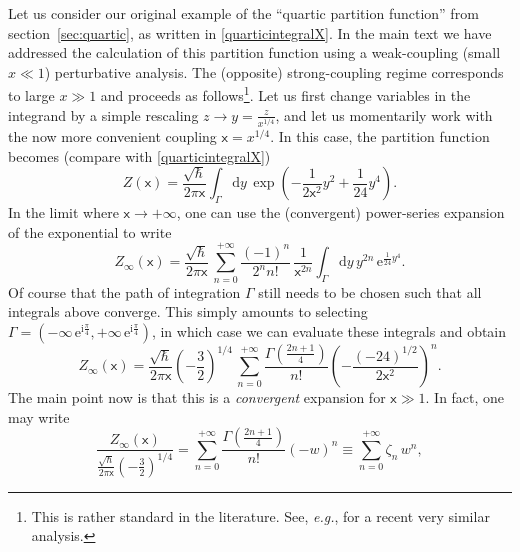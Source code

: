 \documentclass[11pt,a4paper]{article}
\newcommand{\rme}{{\mathrm{e}}}
\newcommand{\rmi}{{\mathrm{i}}}
\newcommand{\rmd}{{\mathrm{d}}}
\begin{document}
Let us consider our original example of the ``quartic partition function'' from section~\ref{sec:quartic}, as written in \eqref{quarticintegralX}. In the main text we have addressed the calculation of this partition function using a weak-coupling (small $x\ll1$) perturbative analysis. The (opposite) strong-coupling regime corresponds to large $x\gg1$ and proceeds as follows\footnote{This is rather standard in the literature. See, \textit{e.g.}, \cite{chps16} for a recent very similar analysis.}. Let us first change variables in the integrand by a simple rescaling $z \to y=\frac{z}{x^{1/4}}$, and let us momentarily work with the now more convenient coupling $\mathsf{x}=x^{1/4}$. In this case, the partition function becomes (compare with \eqref{quarticintegralX})
%
\begin{equation}
\label{quarticintegralX-app}
Z (\mathsf{x}) = \frac{\sqrt{\hbar}}{2\pi\mathsf{x}} \int_{\Gamma} \rmd y\, \exp \left( - \frac{1}{2\mathsf{x}^2} y^2 + \frac{1}{24} y^4 \right).
\end{equation}
%
\noindent
In the limit where $\mathsf{x} \to +\infty$, one can use the (convergent) power-series expansion of the exponential to write
%
\begin{equation}
Z_{\infty} (\mathsf{x}) = \frac{\sqrt{\hbar}}{2\pi\mathsf{x}}\, \sum_{n=0}^{+\infty} \frac{(-1)^n}{2^n n!}\, \frac{1}{\mathsf{x}^{2n}} \int_{\Gamma} \rmd y\, y^{2n}\, \rme^{\frac{1}{24}y^{4}}.
\end{equation}
%
\noindent
Of course that the path of integration $\Gamma$ still needs to be chosen such that all integrals above converge. This simply amounts to selecting $\Gamma = \left( - \infty\, \rme^{\rmi\frac{\pi}{4}}, + \infty\, \rme^{\rmi \frac{\pi}{4}} \right)$, in which case we can evaluate these integrals and obtain
%
\begin{equation}
Z_{\infty} (\mathsf{x}) = \frac{\sqrt{\hbar}}{2\pi\mathsf{x}} \left(-\frac{3}{2}\right)^{1/4}\, \sum_{n=0}^{+\infty} \frac{\Gamma \left( \frac{2n+1}{4} \right)}{n!} \left( - \frac{\left( -24 \right)^{1/2}}{2\mathsf{x}^{2}} \right)^{n}.
\end{equation}
%
\noindent
The main point now is that this is a \textit{convergent} expansion for $\mathsf{x}\gg1$. In fact, one may write
%
\begin{equation}
\frac{Z_{\infty} (\mathsf{x})}{\frac{\sqrt{\hbar}}{2\pi\mathsf{x}} \left( - \frac{3}{2} \right)^{1/4}} = \sum_{n=0}^{+\infty} \frac{\Gamma \left( \frac{2n+1}{4} \right)}{n!} \left(-w\right)^n \equiv \sum_{n=0}^{+\infty} \zeta_n\, w^n,
\end{equation}
\end{document}

